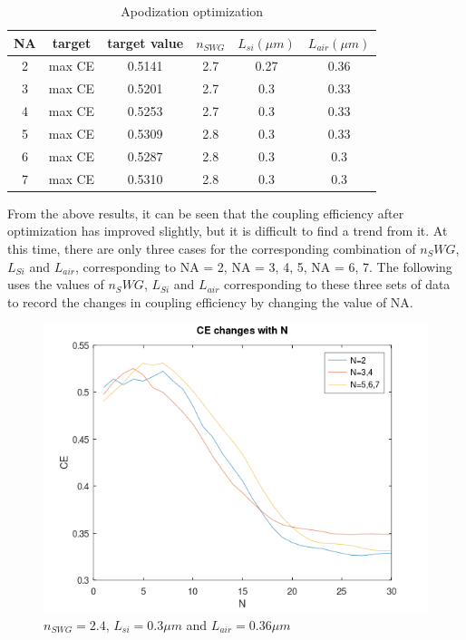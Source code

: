 \documentclass[]{article}
\begin{document}
\begin{table}[htbp]
	\centering
	\caption{Apodization optimization}
	\begin{tabular}{cccccc}
		\hline
		NA & target & target value & $n_{SWG}$ & $L_{si}(\mu m)$ & $L_{air}(\mu m)$ \\ \hline
		2 & max CE & 0.5141 & 2.7 & 0.27 & 0.36 \\
		3 & max CE & 0.5201 & 2.7 & 0.3 & 0.33 \\
		4 & max CE & 0.5253 & 2.7 & 0.3 & 0.33 \\
		5 & max CE & 0.5309 & 2.8 & 0.3 & 0.33 \\
		6 & max CE & 0.5287 & 2.8 & 0.3 & 0.3 \\
		7 & max CE & 0.5310 & 2.8 & 0.3 & 0.3 \\ \hline
	\end{tabular}
\end{table}

\hspace*{\fill} 

From the above results, it can be seen that the coupling efficiency after optimization has improved slightly, but it is difficult to find a trend from it. At this time, there are only three cases for the corresponding combination of $n_SWG$, $L_{Si}$ and $L_{air}$, corresponding to NA = 2, NA = 3, 4, 5, NA = 6, 7. The following uses the values of $n_SWG$, $L_{Si}$ and $L_{air}$ corresponding to these three sets of data to record the changes in coupling efficiency by changing the value of NA.

\begin{figure}[H]
	\centering
	\includegraphics[width=0.7\linewidth]{figures/figure20.png}
	\caption{ $n_{SWG} = 2.4$, $L_{si} = 0.3 \mu m$ and $L_{air} = 0.36 \mu m$}
	\label{fig:figure11}
\end{figure}
\end{document}
